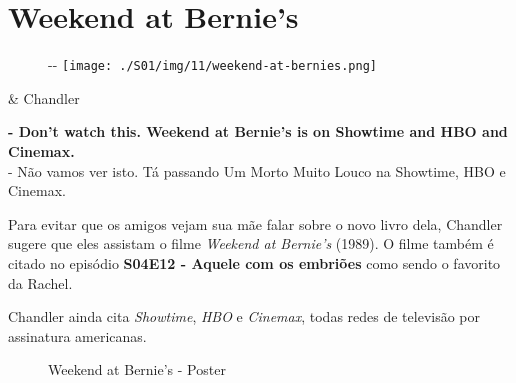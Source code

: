 \hypertarget{weekend-at-bernies}{%
\section{Weekend at Bernie's}\label{weekend-at-bernies}}

\begin{figure}[!ht]
  \begin{adjustwidth}{-\oddsidemargin-1in}{-\rightmargin}
    \centering
    \texttt{[image: ./S01/img/11/weekend-at-bernies.png]}
  \end{adjustwidth}
\end{figure}

\begin{tcolorbox}[enhanced,center upper,
    drop fuzzy shadow southeast, boxrule=0.3pt,
    lower separated=false,
    colframe=black!30!dialogoBorder,colback=white]
\begin{minipage}[c]{0.16\linewidth}
   & \centering \scriptsize{Chandler}
\end{minipage}
\hfill
\begin{minipage}[c]{0.8\linewidth}
  \textbf{- Don't watch this. Weekend at Bernie's is on Showtime and HBO and Cinemax.}\\
  - Não vamos ver isto. Tá passando Um Morto Muito Louco na Showtime, HBO e Cinemax.
\end{minipage}
\end{tcolorbox}

Para evitar que os amigos vejam sua mãe falar sobre o novo livro dela,
Chandler sugere que eles assistam o filme \emph{Weekend at Bernie's}
(1989). O filme também é citado no episódio
\textbf{\textcolor{primarycolor}{S04E12 - Aquele com os embriões}} como
sendo o favorito da Rachel.

Chandler ainda cita \emph{Showtime}, \emph{HBO} e \emph{Cinemax}, todas
redes de televisão por assinatura americanas.

\begin{figure}
  \centering
    \caption{Weekend at Bernie’s - Poster\label{fig:weekend-at-bernie-s-poster}}
\end{figure}

